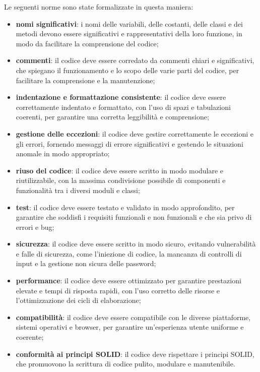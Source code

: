 Le seguenti norme sono state formalizzate in questa maniera:
\begin{itemize}
	\item \textbf{nomi significativi}: i nomi delle variabili, delle costanti, delle classi e dei metodi devono essere significativi e rappresentativi della loro funzione, in modo da facilitare la comprensione del codice;
	\item \textbf{commenti}: il codice deve essere corredato da commenti chiari e significativi, che spiegano il funzionamento e lo scopo delle varie parti del codice, per facilitare la comprensione e la manutenzione;
	\item \textbf{indentazione e formattazione consistente}: il codice deve essere correttamente indentato e formattato, con l'uso di spazi e tabulazioni coerenti, per garantire una corretta leggibilità e comprensione;
	\item \textbf{gestione delle eccezioni}: il codice deve gestire correttamente le eccezioni e gli errori, fornendo messaggi di errore significativi e gestendo le situazioni anomale in modo appropriato;
	\item \textbf{riuso del codice}: il codice deve essere scritto in modo modulare e riutilizzabile, con la massima condivisione possibile di componenti e funzionalità tra i diversi moduli e classi;
	\item \textbf{test}: il codice deve essere testato e validato in modo approfondito, per garantire che soddisfi i requisiti funzionali e non funzionali e che sia privo di errori e bug;
	\item \textbf{sicurezza}: il codice deve essere scritto in modo sicuro, evitando vulnerabilità e falle di sicurezza, come l'iniezione di codice, la mancanza di controlli di input e la gestione non sicura delle password;
	\item \textbf{performance}: il codice deve essere ottimizzato per garantire prestazioni elevate e tempi di risposta rapidi, con l'uso corretto delle risorse e l'ottimizzazione dei cicli di elaborazione;
	\item \textbf{compatibilità}: il codice deve essere compatibile con le diverse piattaforme, sistemi operativi e browser, per garantire un'esperienza utente uniforme e coerente;
	\item \textbf{conformità ai principi SOLID}: il codice deve rispettare i principi SOLID, che promuovono la scrittura di codice pulito, modulare e manutenibile.
\end{itemize}

